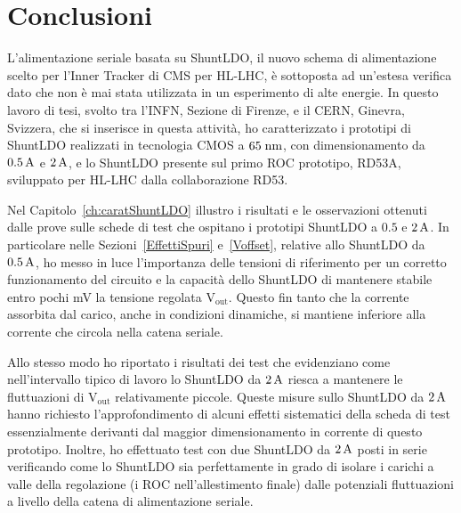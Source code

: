 \chapter{Conclusioni}

L'alimentazione seriale basata su ShuntLDO, il nuovo schema di alimentazione scelto per l'Inner Tracker di CMS per HL-LHC, \`e sottoposta ad un'estesa verifica dato che non \`e mai stata utilizzata in un esperimento di alte energie. In questo lavoro di tesi, svolto tra l'INFN, Sezione di Firenze, e il CERN, Ginevra, Svizzera, che si inserisce in questa attivit\`a, ho  caratterizzato i prototipi di ShuntLDO realizzati in tecnologia CMOS a $65\rm \; nm$, con dimensionamento da $0.5\rm \, A$ e $2\rm \, A$, e lo ShuntLDO presente sul primo ROC prototipo, RD53A, sviluppato per HL-LHC dalla collaborazione RD53.




Nel Capitolo~\ref{ch:caratShuntLDO} illustro i risultati e le osservazioni ottenuti dalle prove sulle schede di test che ospitano i prototipi ShuntLDO a $0.5$ e $2\rm \, A$. 
In particolare nelle Sezioni~\ref{EffettiSpuri} e~\ref{Voffset}, relative allo ShuntLDO da $0.5\rm \, A$, ho messo in luce l'importanza delle tensioni di riferimento per un corretto funzionamento del circuito e la capacità dello ShuntLDO di mantenere stabile entro pochi mV la tensione regolata $\mathrm{V_{out}}$. 
Questo fin tanto che la corrente assorbita dal carico, anche in condizioni dinamiche, si mantiene inferiore alla corrente che circola nella catena seriale.

Allo stesso modo ho riportato i risultati dei test che evidenziano come nell'intervallo tipico di lavoro lo ShuntLDO da $2\rm \, A$ riesca a mantenere le fluttuazioni di $\mathrm{V_{out}}$ relativamente piccole. Queste misure sullo ShuntLDO da $2\rm \, A$ hanno richiesto l'approfondimento di alcuni effetti sistematici della scheda di test essenzialmente derivanti dal maggior dimensionamento in corrente di questo prototipo. 
Inoltre, ho effettuato test con due ShuntLDO da $2\rm \, A$ posti in serie verificando come lo ShuntLDO sia perfettamente in grado di isolare i carichi a valle della regolazione (i ROC nell'allestimento finale) dalle potenziali fluttuazioni a livello della catena di alimentazione seriale.

